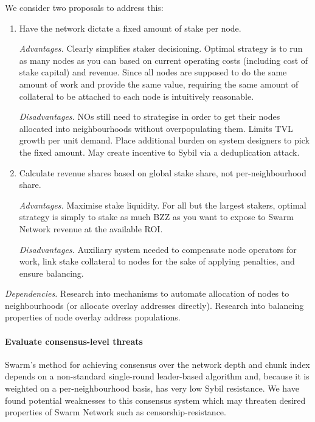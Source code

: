     We consider two proposals to address this:
    \begin{enumerate}
      \item Have the network dictate a fixed amount of stake per node.

      \emph{Advantages.} Clearly simplifies staker decisioning. Optimal strategy is to run as many nodes as you can based on current operating costs (including cost of stake capital) and revenue. Since all nodes are supposed to do the same amount of work and provide the same value, requiring the same amount of collateral to be attached to each node is intuitively reasonable.

      \emph{Disadvantages.} NOs still need to strategise in order to get their nodes allocated into neighbourhoods without overpopulating them. Limits TVL growth per unit demand. Place additional burden on system designers to pick the fixed amount. May create incentive to Sybil via a deduplication attack.

      \item Calculate revenue shares based on global stake share, not per-neighbourhood share.

      \emph{Advantages.} Maximise stake liquidity. For all but the largest stakers, optimal strategy is simply to stake as much BZZ as you want to expose to Swarm Network revenue at the available ROI.

      \emph{Disadvantages.} Auxiliary system needed to compensate node operators for work, link stake collateral to nodes for the sake of applying penalties, and ensure balancing.
    \end{enumerate}

    \emph{Dependencies.}
    Research into mechanisms to automate allocation of nodes to neighbourhoods (or allocate overlay addresses directly).
    Research into balancing properties of node overlay address populations.


\paragraph{Evaluate consensus-level threats}
%
Swarm's method for achieving consensus over the network depth and chunk index depends on a non-standard single-round leader-based algorithm and, because it is weighted on a per-neighbourhood basis, has very low Sybil resistance.
%
We have found potential weaknesses to this consensus system which may threaten desired properties of Swarm Network such as censorship-resistance.

